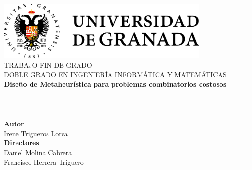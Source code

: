 \begin{titlepage}
 
 
\newlength{\centeroffset}
\setlength{\centeroffset}{-0.5\oddsidemargin}
\addtolength{\centeroffset}{0.5\evensidemargin}
\thispagestyle{empty}

\noindent\hspace*{\centeroffset}\begin{minipage}{\textwidth}

\centering
\includegraphics[width=0.8\textwidth]{imagenes/logo_ugr_nuevo.png}\\[1.4cm]

\textsc{ \Large TRABAJO FIN DE GRADO\\[0.2cm]}
\textsc{ DOBLE GRADO EN INGENIERÍA INFORMÁTICA Y MATEMÁTICAS}\\[1cm]
% 
{\Huge\bfseries Diseño de Metaheurística para problemas combinatorios costosos\\
}
\noindent\rule[-1ex]{\textwidth}{3pt}\\[3.5ex]
\end{minipage}

\vspace{1cm}
\noindent\hspace*{\centeroffset}\begin{minipage}{\textwidth}
\centering

\textbf{Autor}\\ {Irene Trigueros Lorca}\\[2.5ex]
\textbf{Directores}\\
{Daniel Molina Cabrera\\
Francisco Herrera Triguero}\\[1cm]


\end{minipage}
\end{titlepage}
